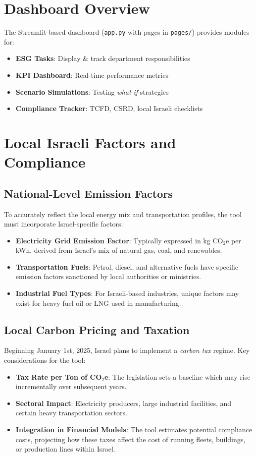\documentclass[12pt]{article}
\begin{document}
\section{Dashboard Overview}
The Streamlit-based dashboard (\texttt{app.py} with pages in \texttt{pages/}) 
provides modules for:
\begin{itemize}
    \item \textbf{ESG Tasks}: Display \& track department responsibilities
    \item \textbf{KPI Dashboard}: Real-time performance metrics
    \item \textbf{Scenario Simulations}: Testing \emph{what-if} strategies
    \item \textbf{Compliance Tracker}: TCFD, CSRD, local Israeli checklists
\end{itemize}

\section{Local Israeli Factors and Compliance}
\label{sec:israeli-factors}

\subsection{National-Level Emission Factors}
To accurately reflect the local energy mix and transportation profiles, 
the tool must incorporate Israel-specific factors:
\begin{itemize}
    \item \textbf{Electricity Grid Emission Factor}: Typically expressed in kg CO$_2$e per kWh, 
    derived from Israel's mix of natural gas, coal, and renewables.
    \item \textbf{Transportation Fuels}: Petrol, diesel, and alternative fuels 
    have specific emission factors sanctioned by local authorities or ministries.
    \item \textbf{Industrial Fuel Types}: For Israeli-based industries, 
    unique factors may exist for heavy fuel oil or LNG used in manufacturing.
\end{itemize}

\subsection{Local Carbon Pricing and Taxation}
Beginning January 1st, 2025, Israel plans to implement a \emph{carbon tax} regime. 
Key considerations for the tool:
\begin{itemize}
    \item \textbf{Tax Rate per Ton of CO$_2$e}: The legislation sets a baseline 
    which may rise incrementally over subsequent years.
    \item \textbf{Sectoral Impact}: Electricity producers, large industrial facilities, 
    and certain heavy transportation sectors.
    \item \textbf{Integration in Financial Models}: The tool estimates potential 
    compliance costs, projecting how these taxes affect the cost of running fleets, 
    buildings, or production lines within Israel.
\end{itemize}
\end{document}
